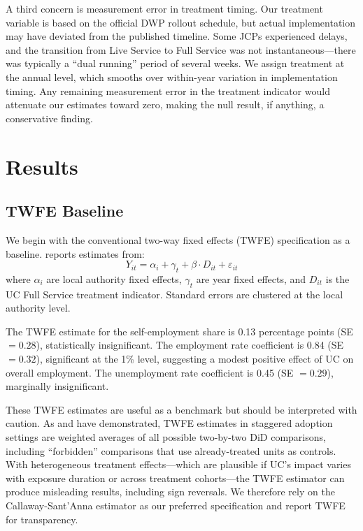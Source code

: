 \documentclass[12pt]{article}
\begin{document}
A third concern is measurement error in treatment timing. Our treatment variable is based on the official DWP rollout schedule, but actual implementation may have deviated from the published timeline. Some JCPs experienced delays, and the transition from Live Service to Full Service was not instantaneous---there was typically a ``dual running'' period of several weeks. We assign treatment at the annual level, which smooths over within-year variation in implementation timing. Any remaining measurement error in the treatment indicator would attenuate our estimates toward zero, making the null result, if anything, a conservative finding.

\section{Results}

\subsection{TWFE Baseline}

We begin with the conventional two-way fixed effects (TWFE) specification as a baseline.  reports estimates from:
\begin{equation}
    Y_{it} = \alpha_i + \gamma_t + \beta \cdot D_{it} + \varepsilon_{it}
\end{equation}
where $\alpha_i$ are local authority fixed effects, $\gamma_t$ are year fixed effects, and $D_{it}$ is the UC Full Service treatment indicator. Standard errors are clustered at the local authority level.

The TWFE estimate for the self-employment share is 0.13 percentage points (SE $= 0.28$), statistically insignificant. The employment rate coefficient is 0.84 (SE $= 0.32$), significant at the 1\% level, suggesting a modest positive effect of UC on overall employment. The unemployment rate coefficient is 0.45 (SE $= 0.29$), marginally insignificant.

These TWFE estimates are useful as a benchmark but should be interpreted with caution. As \citet{goodman-baconDifferenceinDifferencesVariationTreatment2021} and \citet{dechaisemartinTwoWayFixed2020} have demonstrated, TWFE estimates in staggered adoption settings are weighted averages of all possible two-by-two DiD comparisons, including ``forbidden'' comparisons that use already-treated units as controls. With heterogeneous treatment effects---which are plausible if UC's impact varies with exposure duration or across treatment cohorts---the TWFE estimator can produce misleading results, including sign reversals. We therefore rely on the Callaway-Sant'Anna estimator as our preferred specification and report TWFE for transparency.
\end{document}
